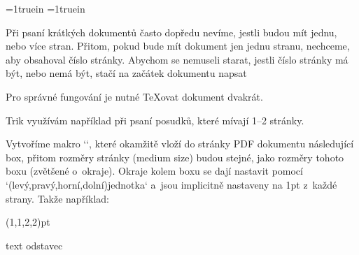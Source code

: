 {\newdimen\lmar \newdimen\tmar \tmar=1truein \lmar=1truein 
\def\cropmarks{%
   \ifx\cropwidth\undefined 
      \advance\lmar by\hoffset \advance\tmar by\voffset 
      \hoffset=-1truein \voffset=-1truein 
      \advance\pdfpagewidth by2\cropw \advance\pdfpageheight by2\cropw 
      \dimen0=\pgwidth \advance\dimen0 by2\cropw \edef\cropwidth{\the\dimen0}%
      \edef\cropheight{\the\pgheight} 
      \let\shipoutori=\shipout 
      \def\shipout##1 {\shipoutori %
         \vbox{\let\vrule=\orivrule \let\hrule=\orihrule 
               \offinterlineskip \kern.2pt 
               \hbox to\cropwidth{\kern.2pt\ltcrop\hfil\rtcrop\kern.2pt}%
               \kern-.2pt 
               \vbox to\cropheight{\kern\tmar\hbox{\kern\cropw\kern\lmar\box0}\vss} 
               \kern-.2pt 
               \hbox to\cropwidth{\kern.2pt\lbcrop\hfil\rbcrop\kern2.pt}}}%
   \else\errmessage{\noexpand\cropmarks can't by used twice}\fi 
} 
\def\cropcenter{\advance\hoffset by-\lmar \advance\hoffset by-\cropw 
                \advance\voffset by-\tmar \advance\voffset by-\cropw} 
\endtt

 


Při psaní krátkých dokumentů často dopředu nevíme, jestli budou mít jednu, nebo více stran. Přitom, pokud bude mít dokument jen jednu stranu, nechceme, aby obsahoval číslo stránky. Abychom se nemuseli starat, jestli číslo stránky má být, nebo nemá být, stačí na začátek dokumentu napsat 

\begtt
\openref\ifnum{}\footline{\hss}\fi 
\endtt


Pro správné fungování je nutné TeXovat dokument dvakrát. 



Trik využívám například při psaní posudků, které mívají 1--2 stránky. 


 


Vytvoříme makro `\outbox`, které okamžitě vloží do stránky PDF dokumentu následující box, přitom rozměry stránky (medium size) budou stejné, jako rozměry tohoto boxu (zvětšené o~okraje). Okraje kolem boxu se dají nastavit pomocí `\outboxmargins(levý,pravý,horní,dolní)jednotka` a~jsou implicitně nastaveny na 1pt z~každé strany. Takže například: 

\begtt
\outboxmargins(1,1,2,2)pt 
 
\outbox\hbox{text}     %
\outbox\vbox{odstavec} %
\endtt


}
